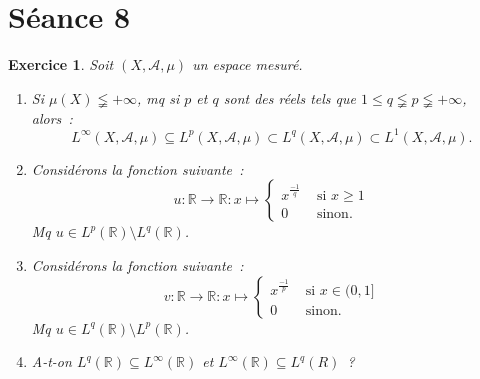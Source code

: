 \documentclass{article}
\newtheorem{ex}{Exercice}[section]
\newcommand{\pinfty}{{+\infty}}
\newcommand{\R}{{\mathbb R}}
\begin{document}
\section{Séance 8}
\begin{ex} Soit $(X, \mathcal A, \mu)$ un espace mesuré.
\begin{enumerate}
	\item Si $\mu(X) \lneqq \pinfty$, mq si $p$ et $q$ sont des réels tels que $1 \leq q \lneqq p \lneqq \pinfty$, alors~:
	\[L^\infty(X, \mathcal A, \mu) \subseteq L^p(X, \mathcal A, \mu) \subset L^q(X, \mathcal A, \mu) \subset L^1(X, \mathcal A, \mu).\]
	\item Considérons la fonction suivante~:
	\[u : \R \to \R : x \mapsto \begin{cases}x^{\frac {-1}q} &\text{ si } x \geq 1 \\0 &\text{ sinon}.\end{cases}\]
	Mq $u \in L^p(\R) \setminus L^q(\R)$.
	\item Considérons la fonction suivante~:
	\[v : \R \to \R : x \mapsto \begin{cases}x^{\frac {-1}p} &\text{ si } x \in (0, 1] \\0 &\text{ sinon}.\end{cases}\]
	Mq $u \in L^q(\R) \setminus L^p(\R)$.
	\item A-t-on $L^q(\R) \subseteq L^\infty(\R)$ et $L^\infty(\R) \subseteq L^q(R)$~?
\end{enumerate}
\end{ex}
\end{document}
